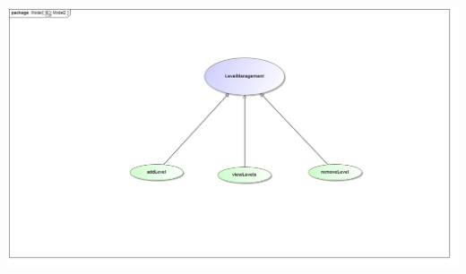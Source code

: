 \documentclass[english]{article}
\begin{document}
				\includegraphics[width=14cm,height=14cm,keepaspectratio]{levelManagement.jpg}
		
\end{document}
